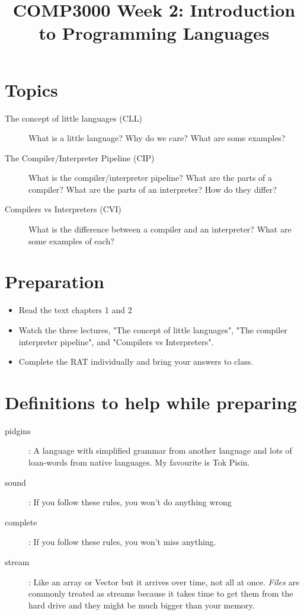 \documentclass[twoside=false, DIV=14]{scrartcl}
\title{\color{redish} \vspace{-1em}COMP3000 Week 2: Introduction to Programming Languages}
\begin{document}
{\color{blackish}\maketitle}\vspace{-7em}

\begin{abstract}
\end{abstract}

\section*{Topics}
\begin{description}
\item[The concept of little languages (CLL)]  What is a little language?  Why do we care?  What are some examples?
\item[The Compiler/Interpreter Pipeline (CIP)]  What is the compiler/interpreter pipeline?  What are the parts of a compiler?  What are the parts of an interpreter?  How do they differ?
\item[Compilers vs Interpreters (CVI)]  What is the difference between a compiler and an interpreter?  What are some examples of each?
\end{description}
\section*{Preparation}
\begin{itemize}
\item Read the text chapters 1 and 2
\item Watch the three lectures, "The concept of little languages", "The compiler interpreter pipeline", and "Compilers vs Interpreters".
\item Complete the RAT individually and bring your answers to class.
\end{itemize}

\section*{Definitions to help while preparing}
\begin{description}
\item[pidgins]: A language with simplified grammar from another language and lots of loan-words from native languages.  My favourite is Tok Pisin.
\item[sound]: If you follow these rules, you won't do anything wrong
\item[complete]: If you follow these rules, you won't miss anything.
\item[stream]: Like an array or Vector but it arrives over time, not all at once.  \emph{Files} are commonly treated as streams because it takes time to get them from the hard drive and they might be much bigger than your memory.
\end{description}
\end{document}
